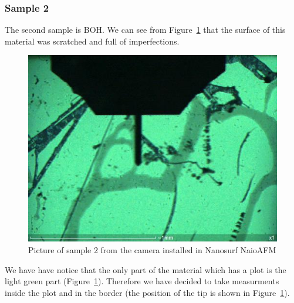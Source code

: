\documentclass[11pt,a4paper]{article}
\begin{document}
\subsubsection{Sample 2}
The second sample is BOH. We can see from Figure~\ref{fig:sample2_set} that the surface of this material was scratched and full of imperfections.
\begin{figure}[ht]
\begin{center}
\includegraphics[scale=0.4]{sm_sample2_set.JPG}
\caption{Picture of sample 2 from the camera installed in Nanosurf NaioAFM}\label{fig:sample2_set}
\end{center}
\end{figure}
We have have notice that the only part of the material which has a plot is the light green part (Figure~\ref{fig:sample2_set}). Therefore we have decided to take measurments inside the plot and in the border (the position of the tip is shown in Figure~\ref{fig:sample2_set}).
\end{document}
